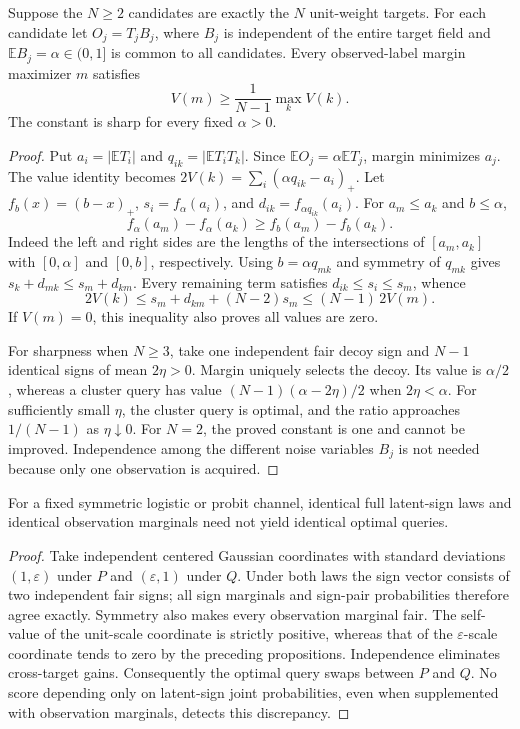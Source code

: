 \begin{theorem}
\label{thm:bsc-margin-r3}
Suppose the $N\ge2$ candidates are exactly the $N$ unit-weight targets.
For each candidate let $O_j=T_jB_j$, where $B_j$ is independent of the
entire target field and $\mathbb{E}B_j=\alpha\in(0,1]$ is common to all
candidates. Every observed-label margin maximizer $m$ satisfies
\[
 V(m)\ge\frac{1}{N-1}\max_k V(k).
\]
The constant is sharp for every fixed $\alpha>0$.
\end{theorem}
\begin{proof}
Put $a_i=|\mathbb{E}T_i|$ and $q_{ik}=|\mathbb{E}T_iT_k|$.
Since $\mathbb{E}O_j=\alpha\mathbb{E}T_j$, margin minimizes $a_j$.
The value identity becomes
$2V(k)=\sum_i(\alpha q_{ik}-a_i)_+$.
Let $f_b(x)=(b-x)_+$, $s_i=f_\alpha(a_i)$, and
$d_{ik}=f_{\alpha q_{ik}}(a_i)$. For $a_m\le a_k$ and $b\le\alpha$,
\[
 f_\alpha(a_m)-f_\alpha(a_k)
 \ge f_b(a_m)-f_b(a_k).
\]
Indeed the left and right sides are the lengths of the intersections of
$[a_m,a_k]$ with $[0,\alpha]$ and $[0,b]$, respectively.
Using $b=\alpha q_{mk}$ and symmetry of $q_{mk}$ gives
$s_k+d_{mk}\le s_m+d_{km}$.
Every remaining term satisfies $d_{ik}\le s_i\le s_m$, whence
\[
 2V(k)
 \le s_m+d_{km}+(N-2)s_m
 \le (N-1)\,2V(m).
\]
If $V(m)=0$, this inequality also proves all values are zero.

For sharpness when $N\ge3$, take one independent fair decoy sign and
$N-1$ identical signs of mean $2\eta>0$. Margin uniquely selects the
decoy. Its value is $\alpha/2$, whereas a cluster query has value
$(N-1)(\alpha-2\eta)/2$ when $2\eta<\alpha$. For sufficiently small
$\eta$, the cluster query is optimal, and the ratio approaches
$1/(N-1)$ as $\eta\downarrow0$. For $N=2$, the proved constant is one
and cannot be improved. Independence among the different noise variables
$B_j$ is not needed because only one observation is acquired.
\end{proof}

\begin{counterexample}
\label{ce:amplitude-swap-r3}
For a fixed symmetric logistic or probit channel, identical full
latent-sign laws and identical observation marginals need not yield
identical optimal queries.
\end{counterexample}
\begin{proof}
Take independent centered Gaussian coordinates with standard deviations
$(1,\varepsilon)$ under $P$ and $(\varepsilon,1)$ under $Q$.
Under both laws the sign vector consists of two independent fair signs;
all sign marginals and sign-pair probabilities therefore agree exactly.
Symmetry also makes every observation marginal fair.
The self-value of the unit-scale coordinate is strictly positive,
whereas that of the $\varepsilon$-scale coordinate tends to zero by the
preceding propositions. Independence eliminates cross-target gains.
Consequently the optimal query swaps between $P$ and $Q$.
No score depending only on latent-sign joint probabilities, even when
supplemented with observation marginals, detects this discrepancy.
\end{proof}

